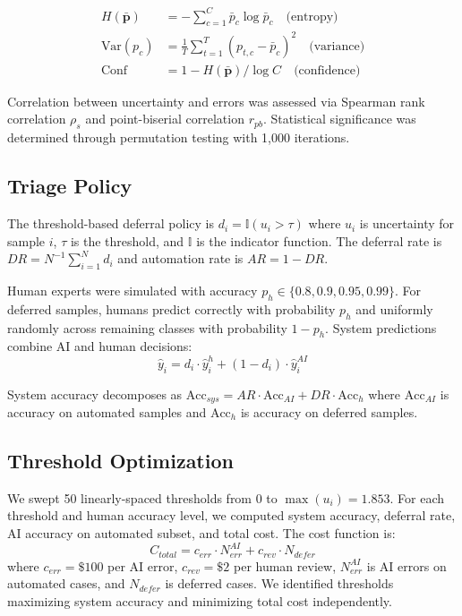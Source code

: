 \documentclass[10pt,a4paper]{article}
\begin{document}
\begin{align}
H(\bar{\mathbf{p}}) &= -\sum_{c=1}^{C} \bar{p}_c \log \bar{p}_c \quad \text{(entropy)} \\
\text{Var}(p_c) &= \frac{1}{T}\sum_{t=1}^{T}(p_{t,c} - \bar{p}_c)^2 \quad \text{(variance)} \\
\text{Conf} &= 1 - H(\bar{\mathbf{p}})/\log C \quad \text{(confidence)}
\end{align}

Correlation between uncertainty and errors was assessed via Spearman rank correlation $\rho_s$ and point-biserial correlation $r_{pb}$. Statistical significance was determined through permutation testing with 1,000 iterations.

\subsection{Triage Policy}

The threshold-based deferral policy is $d_i = \mathbb{I}(u_i > \tau)$ where $u_i$ is uncertainty for sample $i$, $\tau$ is the threshold, and $\mathbb{I}$ is the indicator function. The deferral rate is $DR = N^{-1}\sum_{i=1}^N d_i$ and automation rate is $AR = 1 - DR$.

Human experts were simulated with accuracy $p_h \in \{0.8, 0.9, 0.95, 0.99\}$. For deferred samples, humans predict correctly with probability $p_h$ and uniformly randomly across remaining classes with probability $1-p_h$. System predictions combine AI and human decisions:
\begin{equation}
\hat{y}_i = d_i \cdot \hat{y}_i^h + (1-d_i) \cdot \hat{y}_i^{AI}
\end{equation}

System accuracy decomposes as $\text{Acc}_{sys} = AR \cdot \text{Acc}_{AI} + DR \cdot \text{Acc}_h$ where $\text{Acc}_{AI}$ is accuracy on automated samples and $\text{Acc}_h$ is accuracy on deferred samples.

\subsection{Threshold Optimization}

We swept 50 linearly-spaced thresholds from 0 to $\max(u_i)=1.853$. For each threshold and human accuracy level, we computed system accuracy, deferral rate, AI accuracy on automated subset, and total cost. The cost function is:
\begin{equation}
C_{total} = c_{err} \cdot N_{err}^{AI} + c_{rev} \cdot N_{defer}
\end{equation}
where $c_{err}=\$100$ per AI error, $c_{rev}=\$2$ per human review, $N_{err}^{AI}$ is AI errors on automated cases, and $N_{defer}$ is deferred cases. We identified thresholds maximizing system accuracy and minimizing total cost independently.
\end{document}
